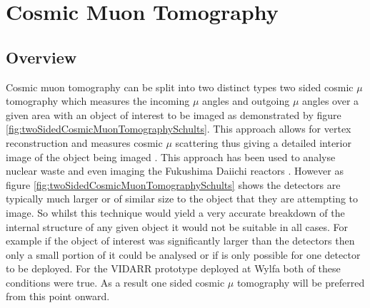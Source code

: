 
\chapter{Cosmic Muon Tomography}

\ifpdf
    \graphicspath{{Chapter5/Figs/Raster/}{Chapter5/Figs/PDF/}{Chapter5/Figs/}}
\else
    \graphicspath{{Chapter5/Figs/Vector/}{Chapter5/Figs/}}
\fi

\section{Overview}
Cosmic muon tomography can be split into two distinct types two sided cosmic $\mu$ tomography which measures the incoming $\mu$ angles and outgoing $\mu$ angles over a given area with an object of interest to be imaged as demonstrated by figure \ref{fig:twoSidedCosmicMuonTomographySchults}. This approach allows for vertex reconstruction and measures cosmic $\mu$ scattering thus giving a detailed interior image of the object being imaged \cite{schultz_2007}. This approach has been used to analyse nuclear waste \cite{jonkmans2013nuclear} and even imaging the Fukushima Daiichi reactors \cite{miyadera2013imaging}. However as figure \ref{fig:twoSidedCosmicMuonTomographySchults} shows the  detectors are typically much larger or of similar size to the object that they are attempting to image. So whilst this technique would yield a very accurate breakdown of the internal structure of any given object it would not be suitable in all cases. For example if the object of interest was significantly larger than the detectors then only a small portion of it could be analysed or if is only possible for one detector to be deployed. For the VIDARR prototype deployed at Wylfa both of these conditions were true. As a result one sided cosmic $\mu$ tomography will be preferred from this point onward. 

